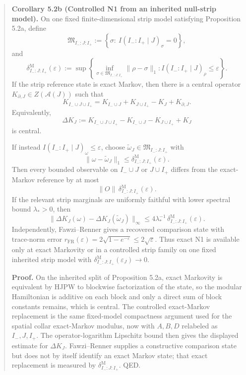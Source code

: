 \begin{quote}
\textbf{Corollary 5.2b (Controlled N1 from an inherited null-strip model).} On one fixed finite-dimensional strip model satisfying Proposition 5.2a, define
\[
\mathfrak M_{I_-:J:I_+}
:=
\left\{
\sigma:\ I(I_-:I_+\mid J)_\sigma=0
\right\},
\]
and
\[
\delta^{\mathrm M}_{I_-:J:I_+}(\varepsilon)
:=
\sup\left\{
\inf_{\sigma\in\mathfrak M_{I_-:J:I_+}}\|\rho-\sigma\|_1:
I(I_-:I_+\mid J)_\rho\le\varepsilon
\right\}.
\]
If the strip reference state is exact Markov, then there is a central operator \(K_{\partial,J}\in Z(\mathcal A(J))\) such that
\[
K_{I_-\cup J\cup I_+}
=
K_{I_-\cup J}+K_{J\cup I_+}-K_J+K_{\partial,J}.
\]
Equivalently,
\[
\Delta K_J
:=
K_{I_-\cup J\cup I_+}-K_{I_-\cup J}-K_{J\cup I_+}+K_J
\]
is central.

If instead \(I(I_-:I_+\mid J)_\omega\le\varepsilon\), choose \(\widetilde\omega_J\in\mathfrak M_{I_-:J:I_+}\) with
\[
\|\omega-\widetilde\omega_J\|_1
\le
\delta^{\mathrm M}_{I_-:J:I_+}(\varepsilon).
\]
Then every bounded observable on \(I_-\cup J\) or \(J\cup I_+\) differs from the exact-Markov reference by at most
\[
\|O\|\,\delta^{\mathrm M}_{I_-:J:I_+}(\varepsilon).
\]
If the relevant strip marginals are uniformly faithful with lower spectral bound \(\lambda_\ast>0\), then
\[
\|\Delta K_J(\omega)-\Delta K_J(\widetilde\omega_J)\|_\infty
\le
4\lambda_\ast^{-1}\,\delta^{\mathrm M}_{I_-:J:I_+}(\varepsilon).
\]
Independently, Fawzi--Renner gives a recovered comparison state with trace-norm error \(r_{\mathrm{FR}}(\varepsilon)=2\sqrt{1-e^{-\varepsilon}}\le 2\sqrt{\varepsilon}\). Thus exact N1 is available only at exact Markovity or in a controlled strip family on one fixed inherited strip model with \(\delta^{\mathrm M}_{I_-:J:I_+}(\varepsilon_J)\to0\).

\textbf{Proof.} On the inherited split of Proposition 5.2a, exact Markovity is equivalent by HJPW to blockwise factorization of the state, so the modular Hamiltonian is additive on each block and only a direct sum of block constants remains, which is central. The controlled exact-Markov replacement is the same fixed-model compactness argument used for the spatial collar exact-Markov modulus, now with \(A,B,D\) relabeled as \(I_-,J,I_+\). The operator-logarithm Lipschitz bound then gives the displayed estimate for \(\Delta K_J\). Fawzi--Renner supplies a constructive comparison state but does not by itself identify an exact Markov state; that exact replacement is measured by \(\delta^{\mathrm M}_{I_-:J:I_+}\). QED.
\end{quote}

